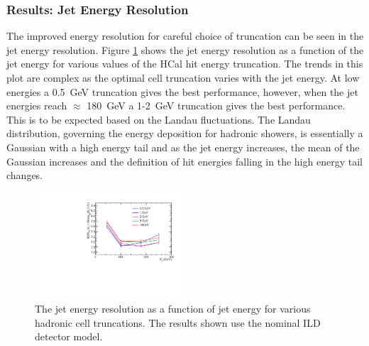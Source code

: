 
\subsubsection{Results: Jet Energy Resolution}

The improved energy resolution for careful choice of truncation can be seen in the jet energy resolution.  Figure \ref{fig:jercelltrunc} shows the jet energy resolution as a function of the jet energy for various values of the HCal hit energy truncation.  The trends in this plot are complex as the optimal cell truncation varies with the jet energy.  At low energies a 0.5~GeV truncation gives the best performance, however, when the jet energies reach $\approx$ 180~GeV a 1-2~GeV truncation gives the best performance.  This is to be expected based on the Landau fluctuations.  The Landau distribution, governing the energy deposition for hadronic showers, is essentially a Gaussian with a high energy tail and as the jet energy increases, the mean of the Gaussian increases and the definition of hit energies falling in the high energy tail changes.  

\begin{figure}[h!]
\includegraphics[width=0.5\textwidth]{EnergyEstimators/Plots/CellTruncation/JER_vs_JetEnergy_HCalCellTruncation.pdf}
\caption[The jet energy resolution as a function of jet energy for various hadronic cell truncations.  The results shown use the nominal ILD detector model.]{The jet energy resolution as a function of jet energy for various hadronic cell truncations.  The results shown use the nominal ILD detector model.}
\label{fig:jercelltrunc}
\end{figure}

